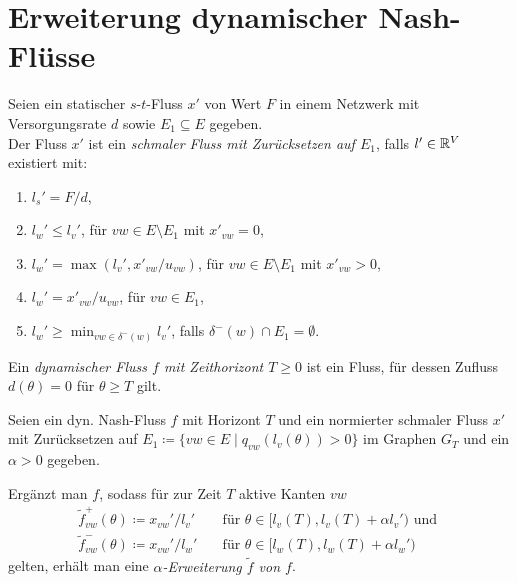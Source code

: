 \section{Erweiterung dynamischer Nash-Flüsse}

\begin{frame}\begin{definition}\label{def-thin-flow}
		Seien ein statischer $s$-$t$-Fluss $x'$ von Wert $F$ in einem Netzwerk mit Versorgungsrate $d$ sowie $E_1\subseteq E$ gegeben. \\
		Der Fluss $x'$ ist ein \emph{schmaler Fluss mit Zurücksetzen auf $E_1$}, falls $l'\in\mathbb{R}^V$ existiert mit:
		\begin{enumerate}[leftmargin=2.5em, label=(T\arabic*)]
			\item\label{def-thin-flow-source} $l_s' = F/d$,
			\item\label{def-thin-flow-x-zero} $l_w' \leq l_v'$, \tabto{5cm} für $vw\in E \setminus E_1$ mit $x'_{vw}=0$,
			\item\label{def-thin-flow-x-positive} $l_w' = \max(l_v', x'_{vw} / u_{vw} )$, \tabto{5cm} für $vw\in E\setminus E_1$ mit $x'_{vw} > 0$,
			\item\label{def-thin-flow-resetting-edge} $l_w' = x'_{vw} / u_{vw}$, \tabto{5cm} für $vw\in E_1$,
			\item\label{def-thin-flow-no-resetting-edge} $l_w' \geq \min_{vw\in \delta^-(w)} l_v'$, \tabto{5cm} falls $\delta^-(w)\cap E_1 = \emptyset$.
		\end{enumerate}
	\end{definition}
\end{frame}

\begin{frame}
	\begin{definition}
		Ein \emph{dynamischer Fluss $f$ mit Zeithorizont $T\geq0$} ist ein Fluss, für dessen Zufluss $d(\theta)= 0$ für $\theta\geq T$ gilt.
	\end{definition}

	\begin{definition}
		Seien ein dyn. Nash-Fluss $f$ mit Horizont $T$ und ein normierter schmaler Fluss $x'$ mit Zurücksetzen auf $E_1 \coloneq \{ vw\in E \mid q_{vw}(l_v(\theta)) > 0 \}$ im Graphen $G_T$ und ein $\alpha > 0$ gegeben.
		
		Ergänzt man $f$, sodass für zur Zeit $T$ aktive Kanten $vw$
		\begin{align*}
			\tilde{f}_{vw}^+(\theta)\coloneq x_{vw}'/l_v'& \text{~~~für $\theta\in [l_v(T), l_v(T)+\alpha l_v')$ und } \\
			\tilde{f}_{vw}^-(\theta)\coloneq x_{vw}'/l_w'& \text{~~~für $\theta\in [l_w(T), l_w(T)+\alpha l_w')$}
		\end{align*}
		gelten, erhält man eine \emph{$\alpha$-Erweiterung $\tilde{f}$ von $f$}.
	\end{definition}
\end{frame}


